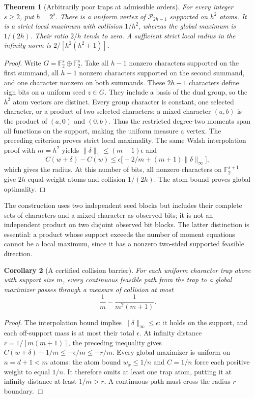 \documentclass[11pt]{article}
\newtheorem{theorem}{Theorem}[section]
\newtheorem{corollary}[theorem]{Corollary}
\begin{document}
\begin{theorem}[Arbitrarily poor traps at admissible orders]
\label{thm:attainment-infinite-traps}
For every integer $s\ge2$, put $h=2^s$. There is a uniform vertex
of $\mathcal P_{2h-1}$ supported on $h^2$ atoms. It is a strict
local maximum with collision $1/h^2$, whereas the global maximum
is $1/(2h)$. Their ratio $2/h$ tends to zero. A sufficient strict
local radius in the infinity norm is $2/[h^2(h^2+1)]$.
\end{theorem}
\begin{proof}
Write $G=\mathbb F_2^s\oplus\mathbb F_2^s$. Take all $h-1$
nonzero characters supported on the first summand, all $h-1$
nonzero characters supported on the second summand, and one character
nonzero on both summands. These $2h-1$ characters define sign bits
on a uniform seed $z\in G$. They include a basis of the dual group,
so the $h^2$ atom vectors are distinct. Every group character is
constant, one selected character, or a product of two selected
characters: a mixed character $(a,b)$ is the product of $(a,0)$ and
$(0,b)$. Thus the restricted degree-two moments span all functions
on the support, making the uniform measure a vertex.
The preceding criterion proves strict local maximality. The same
Walsh interpolation proof with $m=h^2$ yields
$\|\delta\|_1\le(m+1)\epsilon$ and
\[
 C(w+\delta)-C(w)
 \le\epsilon\big[-2/m+(m+1)\|\delta\|_\infty\big],
\]
which gives the radius. At this number of bits, all nonzero characters
on $\mathbb F_2^{s+1}$ give $2h$ equal-weight atoms and collision
$1/(2h)$. The atom bound proves global optimality.
\end{proof}
The construction uses two independent seed blocks but includes their
complete sets of characters and a mixed character as observed bits;
it is not an independent product on two disjoint observed bit blocks.
The latter distinction is essential: a product whose support exceeds
the number of moment equations cannot be a local maximum, since it
has a nonzero two-sided supported feasible direction.

\begin{corollary}[A certified collision barrier]
\label{cor:attainment-barrier}
For each uniform character trap above with support size $m$, every
continuous feasible path from the trap to a global maximizer passes
through a measure of collision at most
\[
 \frac1m-\frac1{m^2(m+1)}.
\]
\end{corollary}
\begin{proof}
The interpolation bound implies $\|\delta\|_\infty\le\epsilon$:
it holds on the support, and each off-support mass is at most their
total $\epsilon$. At infinity distance $r=1/[m(m+1)]$, the preceding
inequality gives $C(w+\delta)-1/m\le-\epsilon/m\le-r/m$.
Every global maximizer is uniform on $n=d+1<m$ atoms: the atom bound
$w_x\le1/n$ and $C=1/n$ force each positive weight to equal $1/n$.
It therefore omits at least one trap atom, putting it at infinity
distance at least $1/m>r$. A continuous path must cross the radius-$r$
boundary.
\end{proof}
\end{document}
